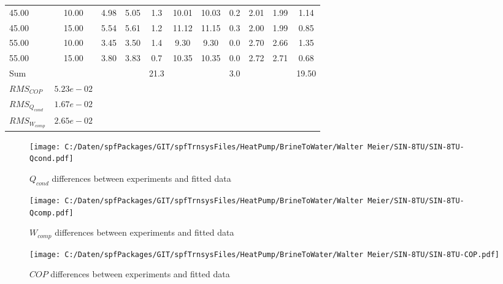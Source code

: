 \documentclass[english]{SPFShortReport}
\begin{document}
\begin{table}[!ht]
\begin{small}
\begin{center}
{\begin{tabular}{l | c c c c c c c c c c }
45.00  & 10.00 & 4.98 & 5.05 & 1.3 & 10.01 & 10.03 & 0.2 & 2.01 & 1.99 & 1.14\\ 
45.00  & 15.00 & 5.54 & 5.61 & 1.2 & 11.12 & 11.15 & 0.3 & 2.00 & 1.99 & 0.85\\ 
55.00  & 10.00 & 3.45 & 3.50 & 1.4 & 9.30 & 9.30 & 0.0 & 2.70 & 2.66 & 1.35\\ 
55.00  & 15.00 & 3.80 & 3.83 & 0.7 & 10.35 & 10.35 & 0.0 & 2.72 & 2.71 & 0.68\\ 
\hline 
 Sum &  & &  & 21.3 &  &  & 3.0 & &  & 19.50\\ 
\hline 
 $RMS_{COP}$ & $5.23e-02$ \\ 
 $RMS_{Q_{cond}}$ & $1.67e-02$ \\ 
 $RMS_{W_{comp}}$ & $2.65e-02$ \\ 
\hline
\hline
\end{tabular}
}
\label{ErrorsTable}
\end{center}
\end{small}
\end{table}
\begin{figure}[!ht]
\begin{center}
\texttt{[image: C:/Daten/spfPackages/GIT/spfTrnsysFiles/HeatPump/BrineToWater/Walter Meier/SIN-8TU/SIN-8TU-Qcond.pdf]}
\caption{$Q_{cond}$ differences between experiments and fitted data}
\label{QcongFig}
\end{center}
\end{figure}
\begin{figure}[!ht]
\begin{center}
\texttt{[image: C:/Daten/spfPackages/GIT/spfTrnsysFiles/HeatPump/BrineToWater/Walter Meier/SIN-8TU/SIN-8TU-Qcomp.pdf]}
\caption{$W_{comp}$ differences between experiments and fitted data}
\label{QcompFig}
\end{center}
\end{figure}
\begin{figure}[!ht]
\begin{center}
\texttt{[image: C:/Daten/spfPackages/GIT/spfTrnsysFiles/HeatPump/BrineToWater/Walter Meier/SIN-8TU/SIN-8TU-COP.pdf]}
\caption{$COP$ differences between experiments and fitted data}
\label{COPFig}
\end{center}
\end{figure}
\end{document}

